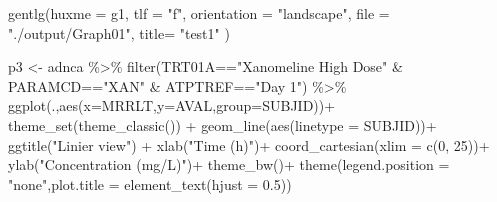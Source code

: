 \documentclass[
  letterpaper,
  DIV=11,
  numbers=noendperiod]{scrreprt}
\newenvironment{Shaded}{\begin{snugshade}}{\end{snugshade}}
\newcommand{\AttributeTok}[1]{\textcolor[rgb]{0.40,0.45,0.13}{#1}}
\newcommand{\DecValTok}[1]{\textcolor[rgb]{0.68,0.00,0.00}{#1}}
\newcommand{\FloatTok}[1]{\textcolor[rgb]{0.68,0.00,0.00}{#1}}
\newcommand{\FunctionTok}[1]{\textcolor[rgb]{0.28,0.35,0.67}{#1}}
\newcommand{\NormalTok}[1]{\textcolor[rgb]{0.00,0.23,0.31}{#1}}
\newcommand{\OtherTok}[1]{\textcolor[rgb]{0.00,0.23,0.31}{#1}}
\newcommand{\SpecialCharTok}[1]{\textcolor[rgb]{0.37,0.37,0.37}{#1}}
\newcommand{\StringTok}[1]{\textcolor[rgb]{0.13,0.47,0.30}{#1}}
\begin{document}
\begin{Shaded}
\begin{Highlighting}[]
\FunctionTok{gentlg}\NormalTok{(}\AttributeTok{huxme =}\NormalTok{ g1,}
       \AttributeTok{tlf =} \StringTok{"f"}\NormalTok{,}
       \AttributeTok{orientation =} \StringTok{"landscape"}\NormalTok{,}
       \AttributeTok{file =} \StringTok{"./output/Graph01"}\NormalTok{,}
       \AttributeTok{title=} \StringTok{"test1"}
\NormalTok{)}

\NormalTok{p3 }\OtherTok{\textless{}{-}}\NormalTok{ adnca }\SpecialCharTok{\%\textgreater{}\%} 
  \FunctionTok{filter}\NormalTok{(TRT01A}\SpecialCharTok{==}\StringTok{"Xanomeline High Dose"} \SpecialCharTok{\&} 
\NormalTok{        PARAMCD}\SpecialCharTok{==}\StringTok{"XAN"} \SpecialCharTok{\&}\NormalTok{ ATPTREF}\SpecialCharTok{==}\StringTok{"Day 1"}\NormalTok{) }\SpecialCharTok{\%\textgreater{}\%}
  \FunctionTok{ggplot}\NormalTok{(.,}\FunctionTok{aes}\NormalTok{(}\AttributeTok{x=}\NormalTok{MRRLT,}\AttributeTok{y=}\NormalTok{AVAL,}\AttributeTok{group=}\NormalTok{SUBJID))}\SpecialCharTok{+}
  \FunctionTok{theme\_set}\NormalTok{(}\FunctionTok{theme\_classic}\NormalTok{()) }\SpecialCharTok{+}
  \FunctionTok{geom\_line}\NormalTok{(}\FunctionTok{aes}\NormalTok{(}\AttributeTok{linetype =}\NormalTok{ SUBJID))}\SpecialCharTok{+}
  \FunctionTok{ggtitle}\NormalTok{(}\StringTok{"Linier view"}\NormalTok{) }\SpecialCharTok{+}
  \FunctionTok{xlab}\NormalTok{(}\StringTok{"Time (h)"}\NormalTok{)}\SpecialCharTok{+}
  \FunctionTok{coord\_cartesian}\NormalTok{(}\AttributeTok{xlim =} \FunctionTok{c}\NormalTok{(}\DecValTok{0}\NormalTok{, }\DecValTok{25}\NormalTok{))}\SpecialCharTok{+}
  \FunctionTok{ylab}\NormalTok{(}\StringTok{"Concentration (mg/L)"}\NormalTok{)}\SpecialCharTok{+}
  \FunctionTok{theme\_bw}\NormalTok{()}\SpecialCharTok{+} 
  \FunctionTok{theme}\NormalTok{(}\AttributeTok{legend.position =} \StringTok{"none"}\NormalTok{,}\AttributeTok{plot.title =} \FunctionTok{element\_text}\NormalTok{(}\AttributeTok{hjust =} \FloatTok{0.5}\NormalTok{)) }


\end{Highlighting}
\end{Shaded}
\end{document}
